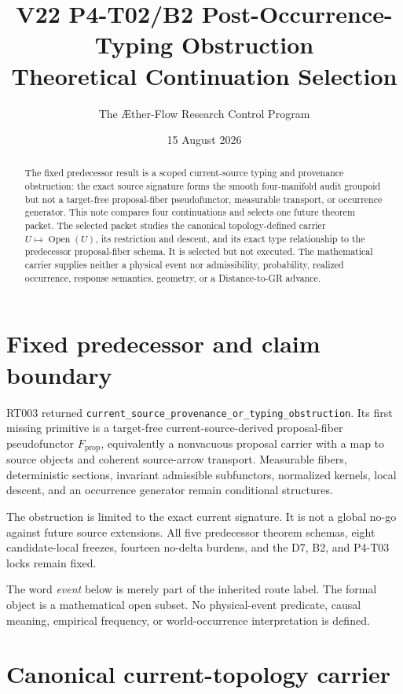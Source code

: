 \documentclass[11pt]{article}
\title{V22 P4-T02/B2 Post-Occurrence-Typing Obstruction\\Theoretical Continuation Selection}
\author{The \AE ther-Flow Research Control Program}
\date{15 August 2026}
\newcommand{\Open}{\operatorname{Open}}
\newcommand{\Fprop}{F_{\mathrm{prop}}}
\begin{document}
\maketitle

\begin{abstract}
The fixed predecessor result is a scoped current-source typing and provenance
obstruction: the exact source signature forms the smooth four-manifold audit
groupoid but not a target-free proposal-fiber pseudofunctor, measurable
transport, or occurrence generator. This note compares four continuations and
selects one future theorem packet. The selected packet studies the canonical
topology-defined carrier \(U\mapsto\Open(U)\), its restriction and descent,
and its exact type relationship to the predecessor proposal-fiber schema. It
is selected but not executed. The mathematical carrier supplies neither a
physical event nor admissibility, probability, realized occurrence, response
semantics, geometry, or a Distance-to-GR advance.
\end{abstract}

\section{Fixed predecessor and claim boundary}

RT003 returned
\texttt{current\_source\_provenance\_or\_typing\_obstruction}. Its first
missing primitive is a target-free current-source-derived proposal-fiber
pseudofunctor \(\Fprop\), equivalently a nonvacuous proposal carrier with a
map to source objects and coherent source-arrow transport. Measurable fibers,
deterministic sections, invariant admissible subfunctors, normalized kernels,
local descent, and an occurrence generator remain conditional structures.

The obstruction is limited to the exact current signature. It is not a global
no-go against future source extensions. All five predecessor theorem schemas,
eight candidate-local freezes, fourteen no-delta burdens, and the D7, B2, and
P4-T03 locks remain fixed.

The word \emph{event} below is merely part of the inherited route label. The
formal object is a mathematical open subset. No physical-event predicate,
causal meaning, empirical frequency, or world-occurrence interpretation is
defined.

\section{Canonical current-topology carrier}
\end{document}
